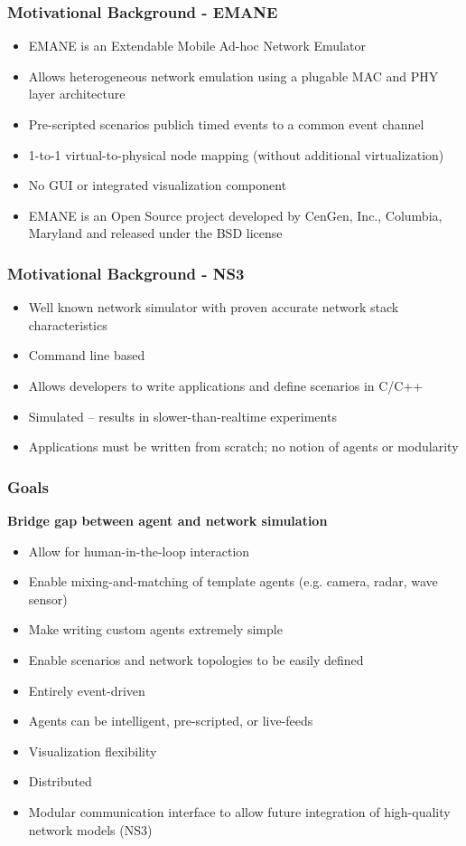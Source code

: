 \documentclass[mathserif]{beamer}
\begin{document}
\frame
{
    \frametitle{Motivational Background - EMANE}
    \begin{itemize}
	\item EMANE is an Extendable Mobile Ad-hoc Network Emulator
	\item Allows heterogeneous network emulation using a plugable MAC and PHY layer architecture
	\item Pre-scripted scenarios publich timed events to a common event channel
	\item 1-to-1 virtual-to-physical node mapping (without additional virtualization)
	\item No GUI or integrated visualization component
	\item EMANE is an Open Source project developed by CenGen, Inc., Columbia, Maryland and released under the BSD license
    \end{itemize}
}

\frame
{
    \frametitle{Motivational Background - NS3}
    \begin{itemize}
	\item Well known network simulator with proven accurate network stack characteristics
	\item Command line based
	\item Allows developers to write applications and define scenarios in C/C++
	\item Simulated -- results in slower-than-realtime experiments
	\item Applications must be written from scratch; no notion of agents or modularity
    \end{itemize}
}

\frame
{
    \frametitle{Goals}
    \textbf{Bridge gap between agent and network simulation}
    \begin{itemize}
        \item Allow for human-in-the-loop interaction
	\item Enable mixing-and-matching of template agents (e.g. camera, radar, wave sensor)
        \item Make writing custom agents extremely simple
        \item Enable scenarios and network topologies to be easily defined
        \item Entirely event-driven
        \item Agents can be intelligent, pre-scripted, or live-feeds
        \item Visualization flexibility
        \item Distributed
        \item Modular communication interface to allow future integration of high-quality network models (NS3)
    \end{itemize}
}
\end{document}
